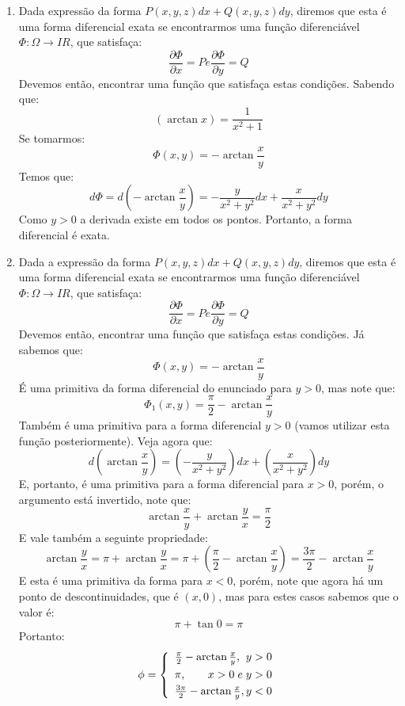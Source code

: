 \documentclass[11pt,a4paper]{article}
\begin{document}
\begin{enumerate}
\item Dada express\~{a}o da forma $ P(x,y,z)dx + Q(x,y,z)dy $, diremos que esta \'{e} uma forma diferencial exata se encontrarmos uma fun\c{c}\~{a}o diferenci\'{a}vel $ \Phi : \Omega \longrightarrow I\!R $, que satisfa\c{c}a: $$ \frac{\partial \Phi}{\partial x} = P e \frac{\partial \Phi}{\partial y} = Q $$ Devemos ent\~{a}o, encontrar uma fun\c{c}\~{a}o que satisfa\c{c}a estas condi\c{c}\~{o}es. Sabendo que: $$ (\arctan x) = \frac{1}{x^2 + 1} $$ Se tomarmos: $$ \Phi (x,y) = -\arctan \frac{x}{y} $$ Temos que: $$ d\Phi = d\left(-\arctan \frac{x}{y} \right) = - \frac{y}{x^2 + y^2} dx + \frac{x}{x^2 + y^2}dy $$ Como $ y > 0 $ a derivada existe em todos os pontos. Portanto, a forma diferencial \'{e} exata.

\item Dada a express\~{a}o da forma $ P(x,y,z)dx + Q(x,y,z)dy $, diremos que esta \'{e} uma forma diferencial exata se encontrarmos uma fun\c{c}\~{a}o diferenci\'{a}vel $ \Phi : \Omega \longrightarrow I\!R $, que satisfa\c{c}a: $$ \frac{\partial \Phi}{\partial x} = P e \frac{\partial \Phi}{\partial y} = Q $$ Devemos ent\~{a}o, encontrar uma fun\c{c}\~{a}o que satisfa\c{c}a estas condi\c{c}\~{o}es. J\'{a} sabemos que: $$ \Phi (x,y) = -\arctan \frac{x}{y} $$ \'{E} uma primitiva da forma diferencial do enunciado para $ y > 0 $, mas note que: $$ \Phi_1 (x,y) = \frac{\pi}{2} - \arctan \frac{x}{y} $$ Tamb\'{e}m \'{e} uma primitiva para a forma diferencial $ y > 0 $ (vamos utilizar esta fun\c{c}\~{a}o posteriormente). Veja agora que: $$ d \left(\arctan \frac{x}{y} \right) = \left(-\frac{y}{x^2 + y^2} \right) dx + \left(\frac{x}{x^2 + y^2} \right) dy $$ E, portanto, \'{e} uma primitiva para a forma diferencial para $ x > 0 $, porém, o argumento est\'{a} invertido, note que: $$ \arctan \frac{x}{y} + \arctan \frac{y}{x} = \frac{\pi}{2} $$ E vale tamb\'{e}m a seguinte propriedade: $$ \arctan \frac{y}{x} = \pi + \arctan \frac{y}{x} = \pi + \left(\frac{\pi}{2} - \arctan \frac{x}{y} \right) = \frac{3 \pi}{2} - \arctan \frac{x}{y} $$ E esta \'{e} uma primitiva da forma para $ x < 0 $, por\'{e}m, note que agora h\'{a} um ponto de descontinuidades, que \'{e} $ (x,0) $, mas para estes casos sabemos que o valor \'{e}: $$ \pi + \tan 0 = \pi $$ Portanto: $$ \phi = \left\{\begin{array}{rc} \frac{\pi}{2} - \arctan \frac{x}{y}, \hspace{\fill} y > 0 \\ \noalign{\smallskip} \pi,\hspace{\fill} x > 0 \hspace{1mm} e \hspace{1mm} y > 0 \\ \noalign{\smallskip} \frac{3\pi}{2} - \arctan \frac{x}{y}, \hspace{\fill} y < 0 \end{array} \right. $$


\end{enumerate}
\end{document}
